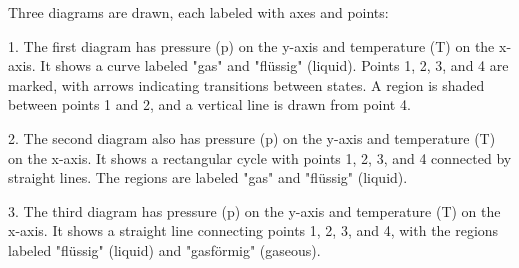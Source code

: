Three diagrams are drawn, each labeled with axes and points:  

1. The first diagram has pressure (p) on the y-axis and temperature (T) on the x-axis. It shows a curve labeled "gas" and "flüssig" (liquid). Points 1, 2, 3, and 4 are marked, with arrows indicating transitions between states. A region is shaded between points 1 and 2, and a vertical line is drawn from point 4.  

2. The second diagram also has pressure (p) on the y-axis and temperature (T) on the x-axis. It shows a rectangular cycle with points 1, 2, 3, and 4 connected by straight lines. The regions are labeled "gas" and "flüssig" (liquid).  

3. The third diagram has pressure (p) on the y-axis and temperature (T) on the x-axis. It shows a straight line connecting points 1, 2, 3, and 4, with the regions labeled "flüssig" (liquid) and "gasförmig" (gaseous).